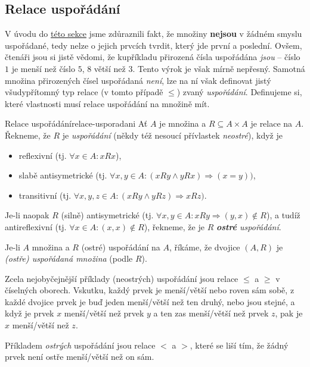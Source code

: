 \subsection{Relace uspořádání}
\label{ssec:relace-usporadani}

V úvodu do \hyperref[sec:zakladni-pojmy-z-teorie-mnozin]{této sekce} jsme
zdůraznili fakt, že množiny \textbf{nejsou} v žádném smyslu uspořádané, tedy
nelze o jejich prvcích tvrdit, který jde první a poslední. Ovšem, čtenáři jsou
si jistě vědomi, že kupříkladu přirozená čísla uspořádána \emph{jsou} -- číslo
$1$ je menší než číslo $5$, $8$ větší než $3$. Tento výrok je však mírně
nepřesný. Samotná množina přirozených čísel uspořádaná \emph{není}, lze na ní
však definovat jistý všudypřítomný typ relace (v tomto případě $ \leq $) zvaný
\emph{uspořádání}. Definujeme si, které vlastnosti musí relace uspořádání na
množině mít.

\begin{definition}{Relace uspořádání}{relace-usporadani}
 Ať $A$ je množina a $R \subseteq A \times A$ je relace na $A$. Řekneme, že $R$
 je \emph{uspořádání} (někdy též nesoucí přívlastek \emph{neostré}), když je
 \begin{itemize}
  \item reflexivní (tj. $ \forall x \in A:xRx$),
  \item slabě antisymetrické (tj. $ \forall x,y \in A:(xRy \wedge yRx)
   \Rightarrow (x=y))$,
  \item transitivní (tj. $ \forall x,y,z \in A:(xRy \wedge yRz) \Rightarrow
   xRz)$.
 \end{itemize}
 Je-li naopak $R$ (silně) antisymetrické (tj. $ \forall x,y \in A:xRy
 \Rightarrow (y,x) \notin R$), a tudíž antireflexivní (tj. $ \forall x \in
 A:(x,x) \notin R$), řekneme, že je $R$ \emph{\textbf{ostré} uspořádání}.

 Je-li $A$ množina a $R$ (ostré) uspořádání na $A$, říkáme, že dvojice $(A,R)$ je
 \emph{(ostře) uspořádaná množina} (podle $R$).
\end{definition}

Zcela nejobyčejnější příklady (neostrých) uspořádání jsou relace $ \leq $ a $
\geq $ v číselných oborech. Vskut\-ku, každý prvek je menší/větší nebo roven sám
sobě, z každé dvojice prvek je buď jeden menší/větší než ten druhý, nebo jsou
stejné, a když je prvek $x$ menší/větší než prvek $y$ a ten zas menší/větší než
prvek $z$, pak je $x$ menší/větší než $z$.

Příkladem \emph{ostrých} uspořádání jsou relace $<$ a $>$, které se liší tím, že
žádný prvek není ostře menší/větší než on sám.


